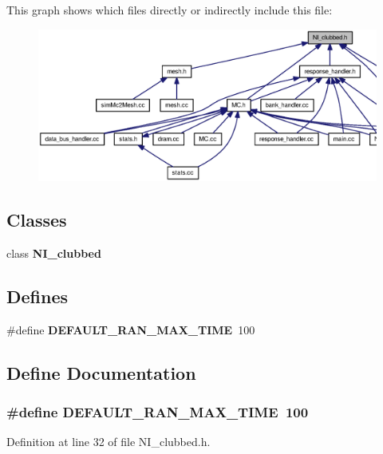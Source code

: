 This graph shows which files directly or indirectly include this file:\nopagebreak
\begin{figure}[H]
\begin{center}
\leavevmode
\includegraphics[width=419pt]{NI__clubbed_8h__dep__incl}
\end{center}
\end{figure}
\subsection*{Classes}
\begin{CompactItemize}
\item 
class {\bf NI\_\-clubbed}
\end{CompactItemize}
\subsection*{Defines}
\begin{CompactItemize}
\item 
\#define {\bf DEFAULT\_\-RAN\_\-MAX\_\-TIME}~100
\end{CompactItemize}


\subsection{Define Documentation}
\subsubsection[{DEFAULT\_\-RAN\_\-MAX\_\-TIME}]{\setlength{\rightskip}{0pt plus 5cm}\#define DEFAULT\_\-RAN\_\-MAX\_\-TIME~100}\label{NI__clubbed_8h_95a6218d50e244f6e58b6cca098c1d65}




Definition at line 32 of file NI\_\-clubbed.h.